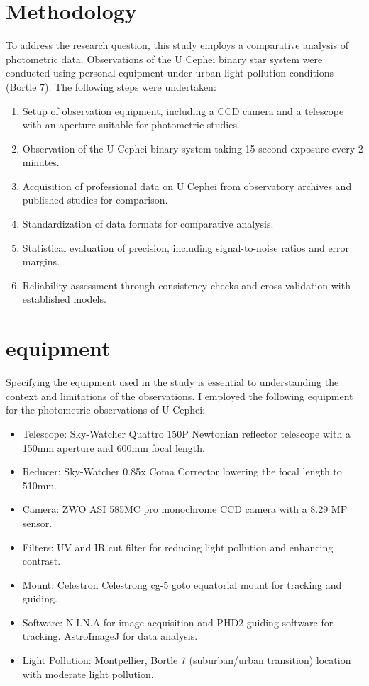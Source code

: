 \documentclass[12pt,a4paper]{article}
\begin{document}
\section{Methodology}
To address the research question, this study employs a comparative analysis of photometric data. Observations of the U Cephei binary star system were conducted using personal equipment under urban light pollution conditions (Bortle 7). The following steps were undertaken:
\begin{enumerate}
    \item Setup of observation equipment, including a CCD camera and a telescope with an aperture suitable for photometric studies.
    \item Observation of the U Cephei binary system taking 15 second exposure every 2 minutes.
    \item Acquisition of professional data on U Cephei from observatory archives and published studies for comparison.
    \item Standardization of data formats for comparative analysis.
    \item Statistical evaluation of precision, including signal-to-noise ratios and error margins.
    \item Reliability assessment through consistency checks and cross-validation with established models.
\end{enumerate}

\section{equipment}
Specifying the equipment used in the study is essential to understanding the context and limitations of the observations. 
I employed the following equipment for the photometric observations of U Cephei:

\begin{itemize}
    \item Telescope: Sky-Watcher Quattro 150P Newtonian reflector telescope with a 150mm aperture and 600mm focal length.
    \item Reducer: Sky-Watcher 0.85x Coma Corrector lowering the focal length to 510mm.
    \item Camera: ZWO ASI 585MC pro monochrome CCD camera with a 8.29 MP sensor.
    \item Filters: UV and IR cut filter for reducing light pollution and enhancing contrast.
    \item Mount: Celestron Celestrong cg-5 goto equatorial mount for tracking and guiding.
    \item Software: N.I.N.A for image acquisition and PHD2 guiding software for tracking. AstroImageJ for data analysis.
    \item Light Pollution: Montpellier, Bortle 7 (suburban/urban transition) location with moderate light pollution.
\end{itemize}
\end{document}
